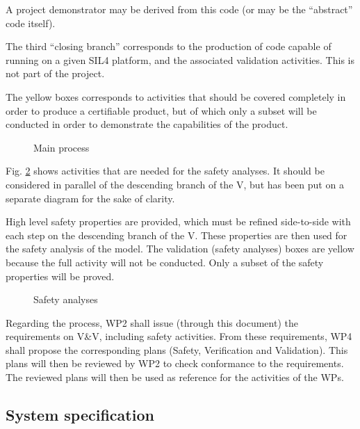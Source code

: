 A project demonstrator may be derived from this code (or may be the ``abstract'' code itself).

The third ``closing branch'' corresponds to the production of code capable of running on a 
given SIL4 platform, and the associated validation activities. This is not part of the project.

The yellow boxes corresponds to activities that should be covered completely in order to produce 
a certifiable product, but of which only a subset will be conducted in order to demonstrate the 
capabilities of the product.

\begin{figure}
  \centering
  \caption{Main process}
  \label{fig:main_process}
\end{figure}

Fig. \ref{fig:safety_process} shows activities that are needed for the safety analyses. It should 
be considered in parallel of the descending branch of the V, but has been put on a separate diagram for
the sake of clarity.

High level safety properties are provided, which must be refined side-to-side with each step on the 
descending branch of the V. These properties are then used for the safety analysis of the model. The 
validation (safety analyses) boxes are yellow because the full activity will not be conducted. Only 
a subset of the safety properties will be proved.

\begin{figure}
  \centering
  \caption{Safety analyses}
  \label{fig:safety_process}
\end{figure}

Regarding the process, WP2 shall issue (through this document) the requirements on V\&V, including
safety activities. From these requirements, WP4 shall propose the corresponding plans (Safety,
Verification and Validation). This plans will then be reviewed by WP2 to check conformance to the 
requirements. The reviewed plans will then be used as reference for the activities of the WPs.



\subsection{System specification}
\begin{comment}This section as to define the activities links to  the system specification and model. 

This step is not explicitly defined in EN 50128 but is defined in EN 50129. However EN 50128  give the expected output from this step  for the software activities :  System  Requirements Specification, System Safety Requirements Specification, System Architecture Description, External  Interface Specifications
\end{comment}

